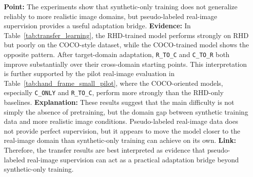 \documentclass[10pt,letterpaper]{article}
\begin{document}
\medskip
\noindent\textbf{Point:} The experiments show that synthetic-only training does not generalize reliably to more realistic image domains, but pseudo-labeled real-image supervision provides a useful adaptation bridge.  
\textbf{Evidence:} In Table~\ref{tab:transfer_learning}, the RHD-trained model performs strongly on RHD but poorly on the COCO-style dataset, while the COCO-trained model shows the opposite pattern. After target-domain adaptation, \texttt{R\_TO\_C} and \texttt{C\_TO\_R} both improve substantially over their cross-domain starting points. This interpretation is further supported by the pilot real-image evaluation in Table~\ref{tab:hand_frame_small_pilot}, where the COCO-oriented models, especially \texttt{C\_ONLY} and \texttt{R\_TO\_C}, perform more strongly than the RHD-only baselines.  
\textbf{Explanation:} These results suggest that the main difficulty is not simply the absence of pretraining, but the domain gap between synthetic training data and more realistic image conditions. Pseudo-labeled real-image data does not provide perfect supervision, but it appears to move the model closer to the real-image domain than synthetic-only training can achieve on its own.  
\textbf{Link:} Therefore, the transfer results are best interpreted as evidence that pseudo-labeled real-image supervision can act as a practical adaptation bridge beyond synthetic-only training.

\begin{table}[H]
\centering
\footnotesize
\caption{Transfer-learning results for the four training sequences evaluated on both RHD and the COCO-style hand dataset. Values are mean $\pm$ std over five seeds, and fusion-mode evaluation is shown because it is the main operating mode in the study.}
\label{tab:transfer_learning}
\end{table}
\end{document}
